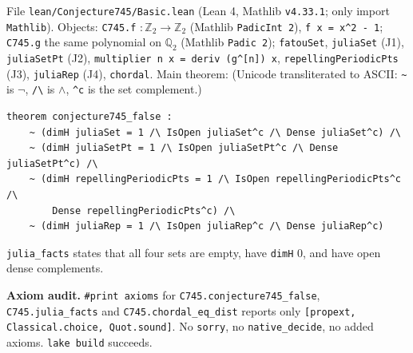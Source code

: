 \documentclass[11pt]{article}
\theoremstyle{definition}
\newcommand{\Zt}{\mathbb{Z}_2}
\newcommand{\Qt}{\mathbb{Q}_2}
\begin{document}
File \texttt{lean/Conjecture745/Basic.lean} (Lean 4, Mathlib \texttt{v4.33.1}; only import
\texttt{Mathlib}). Objects: \texttt{C745.f} $:\Zt\to\Zt$ (Mathlib \texttt{PadicInt 2}),
\texttt{f x = x\^{}2 - 1}; \texttt{C745.g} the same polynomial on $\Qt$ (Mathlib \texttt{Padic 2});
\texttt{fatouSet}, \texttt{juliaSet} (J1), \texttt{juliaSetPt} (J2), \texttt{multiplier n x =
deriv (g\^{}[n]) x}, \texttt{repellingPeriodicPts} (J3), \texttt{juliaRep} (J4), \texttt{chordal}.
Main theorem:
(Unicode transliterated to ASCII: \verb|~| is $\neg$, \verb|/\| is $\wedge$, \verb|^c| is the
set complement.)
\begin{verbatim}
theorem conjecture745_false :
    ~ (dimH juliaSet = 1 /\ IsOpen juliaSet^c /\ Dense juliaSet^c) /\
    ~ (dimH juliaSetPt = 1 /\ IsOpen juliaSetPt^c /\ Dense juliaSetPt^c) /\
    ~ (dimH repellingPeriodicPts = 1 /\ IsOpen repellingPeriodicPts^c /\
        Dense repellingPeriodicPts^c) /\
    ~ (dimH juliaRep = 1 /\ IsOpen juliaRep^c /\ Dense juliaRep^c)
\end{verbatim}
\texttt{julia\_facts} states that all four sets are empty, have \texttt{dimH} $0$, and have open
dense complements.

\textbf{Axiom audit.} \texttt{\#print axioms} for \texttt{C745.conjecture745\_false},
\texttt{C745.julia\_facts} and \texttt{C745.chordal\_eq\_dist} reports only
\texttt{[propext, Classical.choice, Quot.sound]}. No \texttt{sorry}, no \texttt{native\_decide}, no
added axioms. \texttt{lake build} succeeds.
\end{document}
